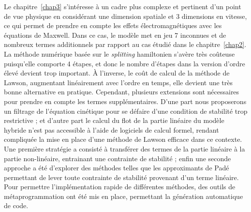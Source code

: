 Le chapitre~\ref{chap3} s'intéresse à un cadre plus complexe et pertinent d'un point de vue physique en considérant une dimension spatiale et 3 dimensions en vitesse, ce qui permet de prendre en compte les effets électromagnétiques avec les équations de Maxwell. Dans ce cas, le modèle met en jeu 7 inconnues et de nombreux termes additionnels par rapport au cas étudié dans le chapitre~\ref{chap2}. La méthode numérique basée sur le \emph{splitting} hamiltonien s'avère très coûteuse puisqu'elle comporte 4 étapes, et donc le nombre d'étapes dans la version d'ordre élevé devient trop important. À l'inverse, le coût de calcul de la méthode de Lawson, augmentant linéairement avec l'ordre en temps, elle devient une très bonne alternative en pratique. Cependant, plusieurs extensions sont nécessaires pour prendre en compte les termes supplémentaires. D'une part nous proposerons un filtrage de l'équation cinétique pour se défaire d'une condition de stabilité trop restrictive ; et d'autre part le calcul du flot de la partie linéaire du modèle hybride n'est pas accessible à l'aide de logiciels de calcul formel, rendant compliquée la mise en place d'une méthode de Lawson efficace dans ce contexte. Une première stratégie a consisté à transférer des termes de la partie linéaire à la partie non-linéaire, entrainant une contrainte de stabilité ; enfin une seconde approche a été d'explorer des méthodes telles que les approximants de Padé permettant de lever toute contrainte de stabilité provenant d'un terme linéaire. Pour permettre l'implémentation rapide de différentes méthodes, des outils de métaprogrammation ont été mis en place, permettant la génération automatique de code.
